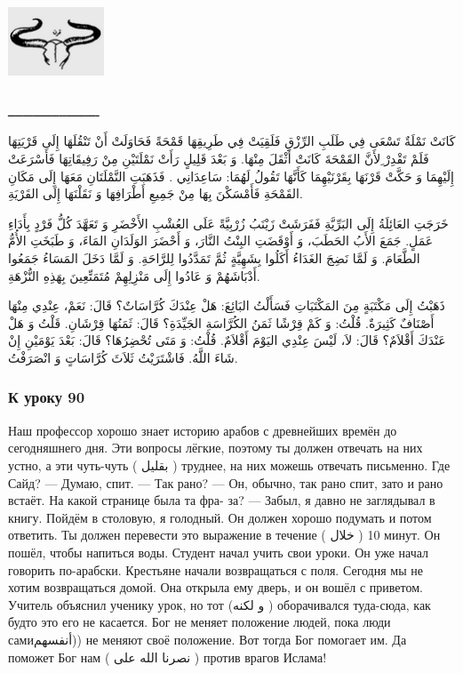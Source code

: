 \documentclass[a5paper]{article}
\begin{document}
\begin{center}
\includegraphics[width=1.1252in,height=1.0547in]{images/MuhammadBagauddinprettified-img286.png}
\end{center}
ـــــــــــــــــــــــــ

كَانَتْ نَمْلَةٌ تَسْعَى فِي طَلَبِ الرِّزْقِ فَلَقِيَتْ فِي طَرِيقِهَا قَمْحَةً فَحَاوَلَتْ أَنْ تَنْقُلَهَا إِلَى قَرْيَتِهَا فَلَمْ تَقْدِرْ ِلأَنَّ القَمْحَةَ كَانَتْ أَثْقَلَ مِنْهَا. وَ بَعْدَ قَلِيلٍ رَأَتْ نَمْلَتَيْنِ مِنْ رَفِيقَاتِهَا فَأَسْرَعَتْ إِلَيْهِمَا وَ حَكَّتْ قَرْنَهَا بِقَرْنَيْهِمَا كَأَنَّهَا تَقُولُ لَهُمَا: سَاعِدَانِي . فَذَهَبَتِ النَّمْلَتَانِ مَعَهَا إِلَى مَكَانِ القَمْحَةِ فَأَمْسَكْنَ بِهَا مِنْ جَمِيعِ أَطْرَافِهَا وَ نَقَلْنَهَا إِلَى القَرْيَةِ.

خَرَجَتِ العَائِلَةُ إِلَى البَرِّيَّةِ فَفَرَشَتْ زَيْنَبُ زُرْبِيَّةً عَلَى العُشْبِ الأَخْضَرِ وَ تَعَهَّدَ كُلُّ فَرْدٍ بِأَدَاءِ عَمَلٍ. جَمَعَ الأَبُ الحَطَبَ، وَ أَوْقَضَتِ البِنْتُ النَّارَ، وَ أَحْضَرَ الوَلَدَانِ المَاءَ، وَ طَبَخَتِ الأُمُّ الطَّعَامَ. وَ لَمَّا نَضِجَ الغَدَاءُ أَكَلُوا بِشَهِيَّةٍ ثُمَّ تَمَدَّدُوا لِلرَّاحَةِ. وَ لَمَّا دَخَلَ المَسَاءُ جَمَعُوا أَدْبَاشَهُمْ وَ عَادُوا إِلَى مَنْزِلِهِمْ مُتَمَتِّعِينَ بِهَذِهِ النُّزْهَةِ.

ذَهَبْتُ إِلَى مَكْتَبَةٍ مِنَ المَكْتَبَاتِ فَسَأَلْتُ البَائِعَ: هَلْ عِنْدَكَ كُرَّاسَاتٌ؟ قَالَ: نَعَمْ، عِنْدِي مِنْهَا أَصْنَافٌ كَثِيرَةٌ. قُلْتُ: وَ كَمْ قِرْشًا ثَمَنُ الكُرَّاسَةِ الجَيِّدَةِ؟ قَالَ: ثَمَنُهَا قِرْشَانِ. قَلْتُ وَ هَلْ عَنْدَكَ أَقْلاَمٌ؟ قَالَ: لاَ، لَيْسَ عِنْدِي اليَوْمَ أَقْلاَمٌ. قُلْتُ: وَ مَتَى تُحْضِرُهَا؟ قَالَ: بَعْدَ يَوْمَيْنِ إِنْ شَاءَ اللَّهُ. فَاشْتَرَيْتُ ثَلاَثَ كُرَّاسَاتٍ وَ انْصَرَفْتُ.

\subsubsection{К уроку 90}
Наш профессор хорошо знает историю арабов с древнейших времён до сегодняшнего дня. Эти вопросы лёгкие, поэтому ты должен отвечать на них устно, а эти чуть-чуть ( بقليل ) труднее, на них можешь отвечать письменно. Где Сайд? — Думаю, спит. — Так рано? — Он, обычно, так рано спит, зато и рано встаёт. На какой странице была та фра- за? — Забыл, я давно не заглядывал в книгу. Пойдём в столовую, я голодный. Он должен хорошо подумать и потом ответить. Ты должен перевести это выражение в течение ( خلال ) 10 минут. Он пошёл, чтобы напиться воды. Студент начал учить свои уроки. Он уже начал говорить по-арабски. Крестьяне начали возвращаться с поля. Сегодня мы не хотим возвращаться домой. Она открыла ему дверь, и он вошёл с приветом. Учитель объяснил ученику урок, но тот (و لكنه ) оборачивался туда-сюда, как будто это его не касается. Бог не меняет положение людей, пока люди самиأنفسهم)) не меняют своё положение. Вот тогда Бог помогает им. Да поможет Бог нам ( نصرنا الله على ) против врагов Ислама!
\end{document}
